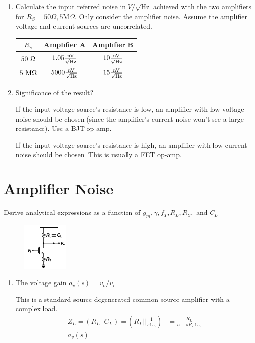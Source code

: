\begin{enumerate}[label=(\alph*)]
  \item {\color{blue}Calculate the input referred noise in $V / \sqrt{\text{Hz}}$ achieved with the two amplifiers for $R_S = 50 \Omega, 5 \text{M}\Omega$. Only consider the amplifier noise. Assume the amplifier voltage and current sources are uncorrelated.}

  \begin{center}
    \begin{tabular}{ |c|c|c| }
      \hline
      $R_s$ & Amplifier A & Amplifier B \\ \hline
      $50 \text{ }\Omega$ & $1.05 \frac{\text{nV}}{\sqrt{\text{Hz}}}$ & $10 \frac{\text{nV}}{\sqrt{\text{Hz}}}$ \\ \hline
      $5 \text{ M}\Omega$ & $5000 \frac{\text{nV}}{\sqrt{\text{Hz}}}$ & $15 \frac{\text{nV}}{\sqrt{\text{Hz}}}$ \\ \hline
    \end{tabular}
  \end{center}

  \item {\color{blue}Significance of the result?}

  If the input voltage source's resistance is low, an amplifier with low voltage noise should be chosen (since the amplifier's current noise won't see a large resistance). Use a BJT op-amp.

  If the input voltage source's resistance is high, an amplifier with low current noise should be chosen. This is usually a FET op-amp.
\end{enumerate}

\section{Amplifier Noise}
Derive analytical expressions as a function of $g_m, \gamma, f_T, R_L, R_S,$ and $C_L$
\begin{figure}[H]
  \centering
  \includegraphics[width=0.2\textwidth]{figs/problem2.png}
\end{figure}

\begin{enumerate}[label=(\alph*)]
  \item {\color{blue}The voltage gain $a_v(s) = v_o / v_i$}

    This is a standard source-degenerated common-source amplifier with a complex load.
    \begin{align*}
      Z_L = (R_L || C_L) = (R_L || \frac{1}{s C_L}) &= \frac{R_L}{a + s R_L C_L} \\
      a_v(s) &= 
    \end{align*}
\end{enumerate}

